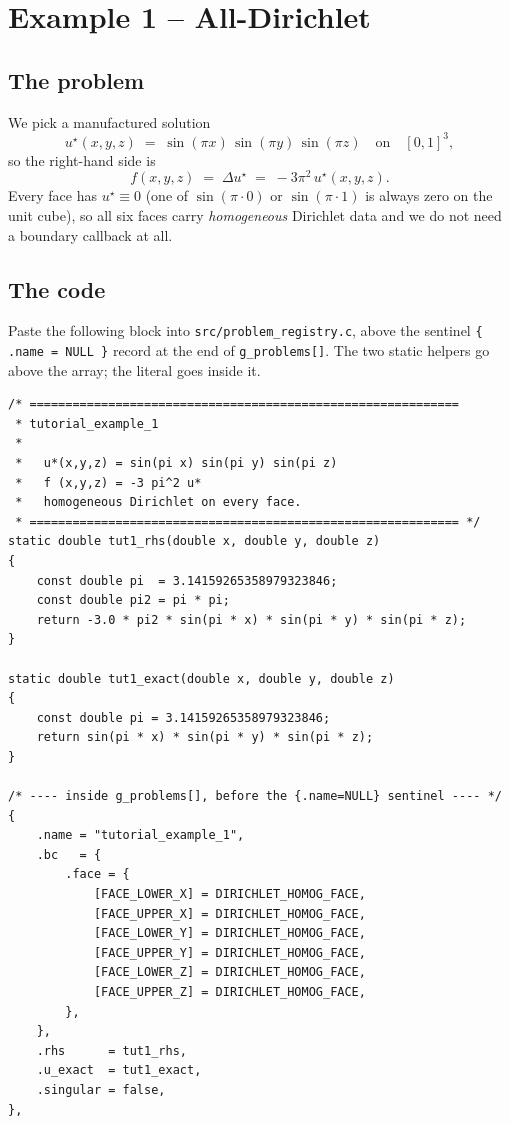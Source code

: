 \documentclass[11pt]{article}
\begin{document}
\section{Example 1 -- All-Dirichlet}\label{sec:example1}

\subsection{The problem}

We pick a manufactured solution
\begin{equation}
  u^\star(x,y,z) \;=\; \sin(\pi x)\,\sin(\pi y)\,\sin(\pi z)
  \quad\text{on}\quad [0,1]^3,
  \label{eq:ex1-u}
\end{equation}
so the right-hand side is
\begin{equation}
  f(x,y,z) \;=\; \Delta u^\star \;=\; -3\pi^2\,u^\star(x,y,z).
  \label{eq:ex1-f}
\end{equation}
Every face has $u^\star \equiv 0$ (one of $\sin(\pi\cdot 0)$ or
$\sin(\pi\cdot 1)$ is always zero on the unit cube), so all six faces
carry \emph{homogeneous} Dirichlet data and we do not need a boundary
callback at all.

\subsection{The code}

Paste the following block into \texttt{src/problem\_registry.c},
above the sentinel \texttt{\{ .name = NULL \}} record at the end of
\texttt{g\_problems[]}.  The two static helpers go above the array;
the literal goes inside it.

\begin{lstlisting}[caption={Example 1: code to add to {\tt src/problem\_registry.c}.}]
/* ============================================================
 * tutorial_example_1
 *
 *   u*(x,y,z) = sin(pi x) sin(pi y) sin(pi z)
 *   f (x,y,z) = -3 pi^2 u*
 *   homogeneous Dirichlet on every face.
 * ============================================================ */
static double tut1_rhs(double x, double y, double z)
{
    const double pi  = 3.14159265358979323846;
    const double pi2 = pi * pi;
    return -3.0 * pi2 * sin(pi * x) * sin(pi * y) * sin(pi * z);
}

static double tut1_exact(double x, double y, double z)
{
    const double pi = 3.14159265358979323846;
    return sin(pi * x) * sin(pi * y) * sin(pi * z);
}

/* ---- inside g_problems[], before the {.name=NULL} sentinel ---- */
{
    .name = "tutorial_example_1",
    .bc   = {
        .face = {
            [FACE_LOWER_X] = DIRICHLET_HOMOG_FACE,
            [FACE_UPPER_X] = DIRICHLET_HOMOG_FACE,
            [FACE_LOWER_Y] = DIRICHLET_HOMOG_FACE,
            [FACE_UPPER_Y] = DIRICHLET_HOMOG_FACE,
            [FACE_LOWER_Z] = DIRICHLET_HOMOG_FACE,
            [FACE_UPPER_Z] = DIRICHLET_HOMOG_FACE,
        },
    },
    .rhs      = tut1_rhs,
    .u_exact  = tut1_exact,
    .singular = false,
},
\end{lstlisting}
\end{document}
